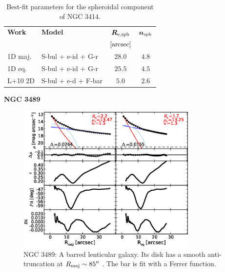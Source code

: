 \documentclass[preprint2]{emulateapj}
\newcommand{\fitfigurewidth}{0.8\textwidth}
\begin{document}
  \begin{table}[h]
  \small
  \caption{Best-fit parameters for the spheroidal component of NGC 3414.}
  \begin{center}
  \begin{tabular}{llcc}
  \hline
  {\bf Work} & {\bf Model}   & $\bm R_{\rm e,sph}$    & $\bm n_{\rm sph}$ \\
    &  &  $[\rm arcsec]$ & \\
  \hline
  1D maj. & S-bul + e-id + G-r & $28.0$  &  $4.8$ \\
  1D eq.  & S-bul + e-id + G-r & $25.5$  &  $4.5$ \\
  \hline
  L+10 2D         & S-bul + e-d + F-bar	  & $5.0$  &  $2.6$ \\
  \hline
  \end{tabular}
  \end{center}
  \label{tab:n3414}
  \end{table}


  \clearpage\newpage\noindent
  {\bf NGC 3489 \\}

  \begin{figure}[h]
  \begin{center}
  \includegraphics[width=\fitfigurewidth]{images/n3489_1Dfit.eps}
  \caption{NGC 3489: 
  A barred lenticular galaxy. 
  Its disk has a smooth anti-truncation at $R_{\rm maj} \sim 85''$ \citep{erwin2008}.
  The bar is fit with a Ferrer function.
  }
  \end{center}
  \end{figure}
\end{document}
